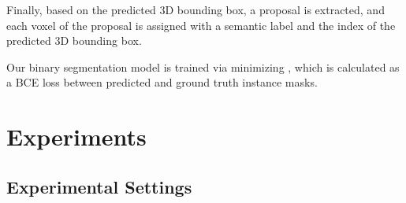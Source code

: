 \documentclass[10pt,twocolumn,letterpaper]{article}
\begin{document}
Finally, based on the predicted 3D bounding box, a proposal is extracted, and each voxel of the proposal is assigned with a semantic label and the index of the predicted 3D bounding box.

Our binary segmentation model is trained via minimizing , which is calculated as a BCE loss between predicted and ground truth instance masks.

\section{Experiments}
\label{sec:experiments}

\subsection{Experimental Settings}
\label{ssec:setup}
\end{document}
